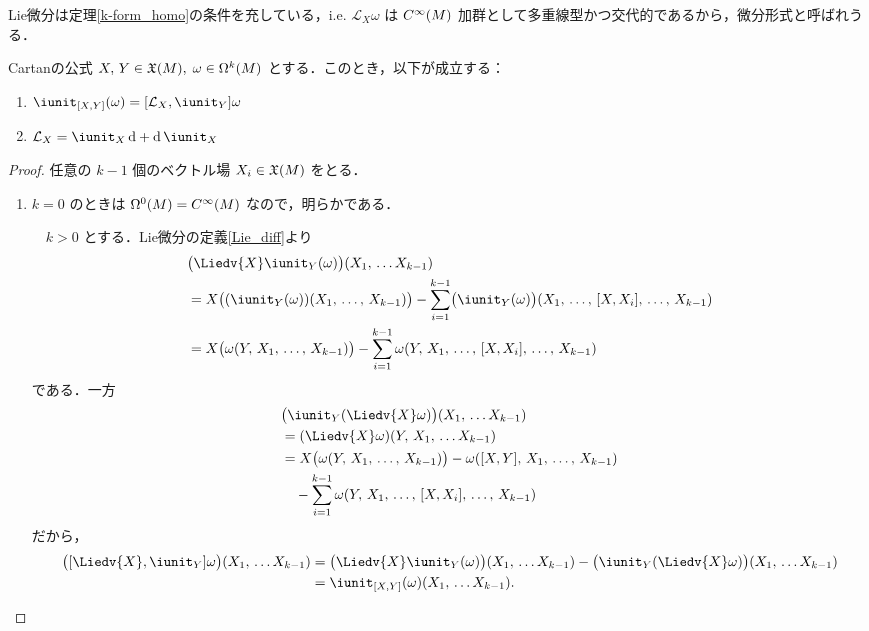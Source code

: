 \documentclass[geometry_main]{subfiles}
\begin{document}
Lie微分は定理\ref{k-form_homo}の条件を充している，i.e. $\mathcal{L}_X \omega$ は $C^\infty(M)$ 加群として多重線型かつ交代的であるから，微分形式と呼ばれうる．

\begin{mytheo}[label=thm.Cartan]{Cartanの公式}
	$X,\, Y \in \mathfrak{X}(M),\; \omega \in \Omega^k(M)$ とする．このとき，以下が成立する：
	\begin{enumerate} 
		\item $\iunit_{\comm{X}{Y}}(\omega) = \comm{\mathcal{L}_X}{\iunit_Y} \omega$
		\item $\mathcal{L}_X = \iunit_X \dd{} + \dd{} \iunit_X$
	\end{enumerate}
\end{mytheo}

\begin{proof} 
	任意の $k-1$ 個のベクトル場 $X_i \in \mathfrak{X}(M)$ をとる．
	\begin{enumerate} 
		\item $k=0$ のときは $\Omega^0(M) = C^\infty(M)$ なので，明らかである．
		
		　$k > 0$ とする．Lie微分の定義\ref{Lie_diff}より
		\begin{align} 
			&\bigl( \Liedv{X} \iunit_Y (\omega) \bigr)(X_1,\, \dots X_{k-1}) \\
			&= X \bigl( (\iunit_Y(\omega))(X_1,\, \dots ,\, X_{k-1}) \bigr)  - \sum_{i=1}^{k-1} \bigl( \iunit_Y(\omega) \bigr) (X_1,\, \dots ,\, \comm{X}{X_i},\, \dots ,\, X_{k-1}) \\
			&= X \bigl( \omega(Y,\, X_1,\, \dots ,\, X_{k-1}) \bigr)  - \sum_{i=1}^{k-1} \omega(Y,\, X_1,\, \dots ,\, \comm{X}{X_i},\, \dots ,\, X_{k-1}) 
		\end{align}
		である．一方
		\begin{align} 
			&\bigl( \iunit_Y(\Liedv{X} \omega) \bigr)(X_1,\, \dots X_{k-1}) \\
			&= (\Liedv{X} \omega)(Y,\, X_1,\, \dots X_{k-1}) \\
			&= X \bigl( \omega(Y,\, X_1,\, \dots ,\, X_{k-1}) \bigr) - \omega(\comm{X}{Y},\, X_1,\, \dots ,\, X_{k-1}) \\
			&\quad - \sum_{i=1}^{k-1} \omega(Y,\, X_1,\, \dots ,\, \comm{X}{X_i},\, \dots ,\, X_{k-1}) 
		\end{align}
		だから，
		\begin{align} 
			\bigl(\comm{\Liedv{X}}{\iunit_Y}\omega\bigr) (X_1,\, \dots X_{k-1}) &= \bigl( \Liedv{X} \iunit_Y (\omega) \bigr)(X_1,\, \dots X_{k-1}) - \bigl( \iunit_Y(\Liedv{X} \omega) \bigr)(X_1,\, \dots X_{k-1}) \\
			&= \iunit_{\comm{X}{Y}}(\omega) (X_1,\, \dots X_{k-1}).
		\end{align}
		

\end{enumerate}
\end{proof}
\end{document}
